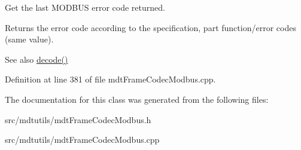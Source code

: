 Get the last MODBUS error code returned. 

Returns the error code according to the specification, part function/error codes (same value). \begin{DoxySeeAlso}{See also}
\hyperlink{classmdt_frame_codec_modbus_a426f465363a49d70890a462b40677787}{decode()} 
\end{DoxySeeAlso}


Definition at line 381 of file mdtFrameCodecModbus.cpp.



The documentation for this class was generated from the following files:\begin{DoxyCompactItemize}
\item 
src/mdtutils/mdtFrameCodecModbus.h\item 
src/mdtutils/mdtFrameCodecModbus.cpp\end{DoxyCompactItemize}

